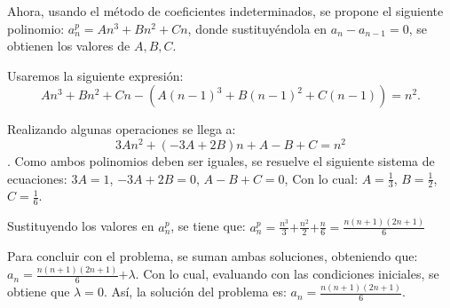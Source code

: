 \documentclass{report}
\theoremstyle{definition}
\begin{document}
Ahora, usando el método de coeficientes indeterminados, se propone el
siguiente polinomio: $a^p_n=An^3+Bn^2+Cn$, donde sustituyéndola en
$a_n-a_{n-1}=0$, se obtienen los valores de $A,B,C$.

Usaremos la siguiente expresión:
\begin{equation}
  \label{polinomial}
   An^3+Bn^2+Cn-(A(n-1)^3+B(n-1)^2+C(n-1))=n^2.  
\end{equation}

Realizando algunas operaciones se llega a:
$$3An^2+(-3A+2B)n+A-B+C=n^2$$.
Como ambos polinomios deben ser iguales, se resuelve el siguiente sistema de ecuaciones:
$3A=1$,
$-3A+2B=0$,
$A-B+C=0$,
Con lo cual: $A=\frac{1}{3}$, $B=\frac{1}{2}$, $C=\frac{1}{6}$.

Sustituyendo los valores en $a^p_n$, se tiene que:
$a^p_n=\frac{n^3}{3}$$+\frac{n^2}{2}$$+\frac{n}{6}=$$\frac{n(n+1)(2n+1)}{6}$

Para concluir con el problema, se suman ambas soluciones, obteniendo que:
$a_n=\frac{n(n+1)(2n+1)}{6}$$+\lambda$.
Con lo cual, evaluando con las condiciones iniciales, se obtiene que $\lambda$$=0$.
Así, la solución del problema es:
$a_n=\frac{n(n+1)(2n+1)}{6}$.
\end{document}

